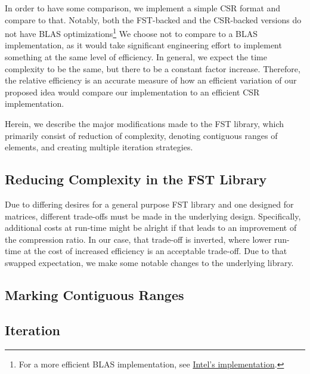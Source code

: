 \documentclass[12pt]{article}
\begin{document}
In order to have some comparison, we implement a simple CSR
format and compare to that. Notably, both the FST-backed and the CSR-backed versions do not have
BLAS optimizations\footnote{For a more efficient BLAS implementation, see
\href{https://software.intel.com/en-us/mkl-developer-reference-c-sparse-blas-csr-matrix-storage-format}
{Intel's implementation}.} We choose not to compare to a BLAS implementation, as it would take
significant engineering effort to implement something at the same level of efficiency. In general,
we expect the time complexity to be the same, but there to be a constant factor increase.
Therefore, the relative efficiency is an accurate measure of how an efficient variation of our
proposed idea would compare our implementation to an efficient CSR implementation.

Herein, we describe the major modifications made to the FST library, which primarily consist of
reduction of complexity, denoting contiguous ranges of elements, and creating multiple iteration
strategies.


\subsection*{Reducing Complexity in the FST Library}

Due to differing desires for a general purpose FST library and one designed for matrices,
different trade-offs must be made in the underlying design. Specifically, additional costs at
run-time might be alright if that leads to an improvement of the compression ratio. In our case,
that trade-off is inverted, where lower run-time at the cost of increased efficiency is an
acceptable trade-off. Due to that swapped expectation, we make some notable changes to the
underlying library.


\subsection*{Marking Contiguous Ranges}


\subsection*{Iteration}
\end{document}
